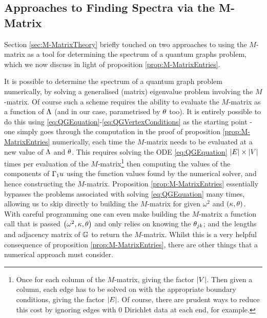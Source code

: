\subsection{Approaches to Finding Spectra via the M-Matrix} \label{sec:NumericalMethodsDiscussion}
Section \ref{sec:M-MatrixTheory} briefly touched on two approaches to using the $M$-matrix as a tool for determining the spectrum of a quantum graphs problem, which we now discuss in light of proposition \ref{prop:M-MatrixEntries}. \newline

It is possible to determine the spectrum of a quantum graph problem numerically, by solving a generalised (matrix) eigenvalue problem involving the $M$-matrix.
Of course such a scheme requires the ability to evaluate the $M$-matrix as a function of $\Lambda$ (and in our case, parametrised by $\theta$ too).
It is entirely possible to do this using \eqref{eq:QGEquation}-\eqref{eq:QGVertexConditions} as the starting point - one simply goes through the computation in the proof of proposition \ref{prop:M-MatrixEntries} numerically, each time the $M$-matrix needs to be evaluated at a new value of $\Lambda$ and $\theta$.
This requires solving the ODE \eqref{eq:QGEquation} $\left\lvert E \right\rvert\times\left\lvert V \right\rvert$ times per evaluation of the $M$-matrix\footnote{Once for each column of the $M$-matrix, giving the factor $\left\lvert V \right\rvert$. 
Then given a column, each edge has to be solved on with the appropriate boundary conditions, giving the factor $\left\lvert E \right\rvert$. 
Of course, there are prudent ways to reduce this cost by ignoring edges with 0 Dirichlet data at each end, for example.}
then computing the values of the components of $\Gamma_1 u$ using the function values found by the numerical solver, and hence constructing the $M$-matrix.
Proposition \ref{prop:M-MatrixEntries} essentially bypasses the problems associated with solving \eqref{eq:QGEquation} many times, allowing us to skip directly to building the $M$-matrix for given $\omega^2$ and $\left( \kappa, \theta \right)$.
With careful programming one can even make building the $M$-matrix a function call that is passed $\left( \omega^2, \kappa, \theta \right)$ and only relies on knowing the $\theta_{jk}$; and the lengths and adjacency matrix of $\mathbb{G}$ to return the $M$-matrix. 
Whilst this is a very helpful consequence of proposition \ref{prop:M-MatrixEntries}, there are other things that a numerical approach must consider.
